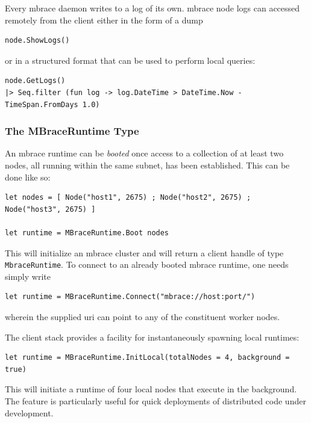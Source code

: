 \documentclass[9pt,a4paper]{article}
\newcommand{\mbrace}{mbrace}
\newcommand{\Mbrace}{\mbrace}
\begin{document}
Every \mbrace{} daemon writes to a log of its own. \Mbrace{} node logs can accessed remotely
from the client either in the form of a dump
\begin{lstlisting}
node.ShowLogs()
\end{lstlisting}
or in a structured format that can be used to perform local queries:
\begin{lstlisting}
node.GetLogs() 
|> Seq.filter (fun log -> log.DateTime > DateTime.Now - TimeSpan.FromDays 1.0)
\end{lstlisting}

\subsubsection*{The MBraceRuntime Type}

An \mbrace{} runtime can be \emph{booted} once access to a collection of at least two nodes,
all running within the same subnet, has been established. This can be done like so:
\begin{lstlisting}
let nodes = [ Node("host1", 2675) ; Node("host2", 2675) ; Node("host3", 2675) ]

let runtime = MBraceRuntime.Boot nodes
\end{lstlisting}
This will initialize an \mbrace{} cluster and will return a client handle of type
\texttt{MbraceRuntime}. 
%
To connect to an already booted \mbrace{} runtime, one needs simply write
\begin{lstlisting}
let runtime = MBraceRuntime.Connect("mbrace://host:port/")
\end{lstlisting}
wherein the supplied uri can point to any of the constituent worker nodes.

The client stack provides a facility for instantaneously spawning local runtimes:
\begin{lstlisting}
let runtime = MBraceRuntime.InitLocal(totalNodes = 4, background = true)
\end{lstlisting}
This will initiate a runtime of four local nodes that execute in the background.
The feature is particularly useful for quick deployments of distributed code under development.
\end{document}
